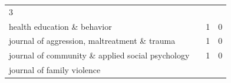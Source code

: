 \documentclass[]{tufte-handout}
\begin{document}
\begin{longtable}[]{@{}llll@{}}
\begin{minipage}[t]{0.06\columnwidth}
3\strut
\end{minipage}\tabularnewline
\begin{minipage}[t]{0.63\columnwidth}\raggedright\strut
health education \& behavior\strut
\end{minipage} & \begin{minipage}[t]{0.04\columnwidth}\raggedright\strut
\strut
\end{minipage} & \begin{minipage}[t]{0.06\columnwidth}\raggedright\strut
1\strut
\end{minipage} & \begin{minipage}[t]{0.06\columnwidth}\raggedright\strut
0\strut
\end{minipage}\tabularnewline
\begin{minipage}[t]{0.63\columnwidth}\raggedright\strut
journal of aggression, maltreatment \& trauma\strut
\end{minipage} & \begin{minipage}[t]{0.04\columnwidth}\raggedright\strut
\strut
\end{minipage} & \begin{minipage}[t]{0.06\columnwidth}\raggedright\strut
1\strut
\end{minipage} & \begin{minipage}[t]{0.06\columnwidth}\raggedright\strut
0\strut
\end{minipage}\tabularnewline
\begin{minipage}[t]{0.63\columnwidth}\raggedright\strut
journal of community \& applied social psychology\strut
\end{minipage} & \begin{minipage}[t]{0.04\columnwidth}\raggedright\strut
\strut
\end{minipage} & \begin{minipage}[t]{0.06\columnwidth}\raggedright\strut
1\strut
\end{minipage} & \begin{minipage}[t]{0.06\columnwidth}\raggedright\strut
0\strut
\end{minipage}\tabularnewline
\begin{minipage}[t]{0.63\columnwidth}\raggedright\strut
journal of family violence\strut
\end{minipage} & \begin{minipage}[t]{0.04\columnwidth}\raggedright\strut
\strut
\end{minipage} & \begin{minipage}[t]{0.06\columnwidth}\raggedright\strut

\end{minipage}
\end{longtable}
\end{document}
